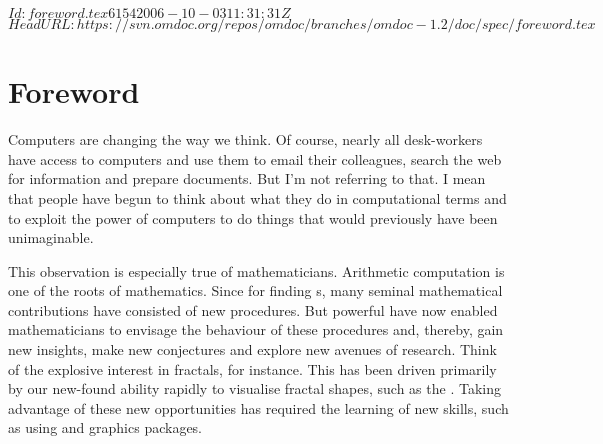 \svnInfo $Id: foreword.tex 6154 2006-10-03 11:31:31Z  $
\svnKeyword $HeadURL: https://svn.omdoc.org/repos/omdoc/branches/omdoc-1.2/doc/spec/foreword.tex $

\section*{Foreword}

Computers are changing the way we think. Of course, nearly all desk-workers have access to
computers and use them to email their colleagues, search the web for information and
prepare documents.  But I'm not referring to that. I mean that people have begun to think
about what they do in computational terms and to exploit the power of computers to do
things that would previously have been unimaginable.

This observation is especially true of mathematicians. Arithmetic computation is one of
the roots of mathematics. Since {} for finding
{s}, many seminal mathematical contributions have
consisted of new procedures. But powerful {} have now enabled
mathematicians to envisage the behaviour of these procedures and, thereby, gain new
insights, make new conjectures and explore new avenues of research. Think of the explosive
interest in fractals, for instance.  This has been driven primarily by our new-found
ability rapidly to visualise fractal shapes, such as the {}.
Taking advantage of these new opportunities has required the learning of new skills, such
as using {} and graphics packages.

